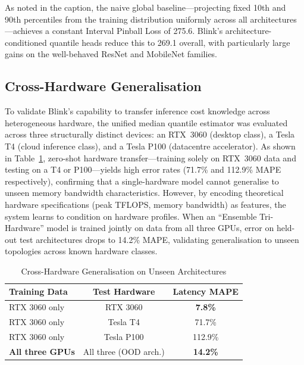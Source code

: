 \documentclass[conference]{IEEEtran}
\begin{document}
As noted in the caption, the naive global baseline---projecting fixed 10th and
90th percentiles from the training distribution uniformly across all
architectures---achieves a constant Interval Pinball Loss of 275.6. Blink's
architecture-conditioned quantile heads reduce this to 269.1 overall, with
particularly large gains on the well-behaved ResNet and MobileNet families.

\subsection{Cross-Hardware Generalisation}

To validate Blink's capability to transfer inference cost knowledge across
heterogeneous hardware, the unified median quantile estimator was evaluated
across three structurally distinct devices: an RTX~3060 (desktop class), a
Tesla T4 (cloud inference class), and a Tesla P100 (datacentre accelerator).
As shown in Table~\ref{tab:hardware_xfer}, zero-shot hardware transfer---training
solely on RTX~3060 data and testing on a T4 or P100---yields high error rates
(71.7\% and 112.9\% MAPE respectively), confirming that a single-hardware model
cannot generalise to unseen memory bandwidth characteristics. However, by encoding
theoretical hardware specifications (peak TFLOPS, memory bandwidth) as features,
the system learns to condition on hardware profiles. When an ``Ensemble
Tri-Hardware'' model is trained jointly on data from all three GPUs, error on
held-out test architectures drops to 14.2\% MAPE, validating generalisation to
unseen topologies across known hardware classes.

\begin{table}[htbp]
\centering
\caption{Cross-Hardware Generalisation on Unseen Architectures}
\label{tab:hardware_xfer}
\renewcommand{\arraystretch}{1.2}
\begin{tabular}{@{}lcc@{}}
\toprule
\textbf{Training Data} & \textbf{Test Hardware} & \textbf{Latency MAPE} \\
\midrule
RTX 3060 only      & RTX 3060              & \textbf{7.8\%}  \\
RTX 3060 only      & Tesla T4              & 71.7\%          \\
RTX 3060 only      & Tesla P100            & 112.9\%         \\
\textbf{All three GPUs} & All three (OOD arch.) & \textbf{14.2\%} \\
\bottomrule
\end{tabular}
\end{table}
\end{document}
